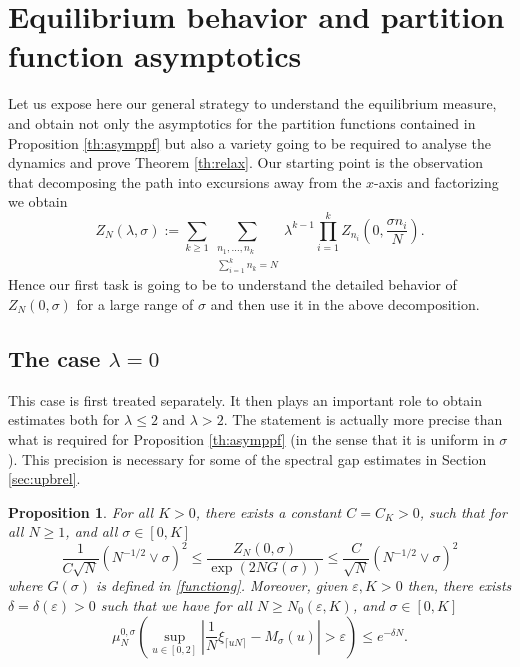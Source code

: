 \documentclass[reqno,11pt]{amsart}
\numberwithin{equation}{section}
\newcommand{\gep}{\varepsilon}       %
\newcommand{\gl}{\lambda}
\newtheorem{proposition}[theorem]{Proposition}
\newcommand{\sumtwo}[2]{\sum_{\substack{#1 \\ #2}}} %
\begin{document}
\section{Equilibrium behavior and partition function asymptotics} \label{sec:partitionfunction}

 Let us expose here our general strategy to understand the equilibrium measure, and obtain not only the asymptotics for the partition functions contained in Proposition \ref{th:asymppf} but also a variety going to be required to analyse the dynamics and prove Theorem \ref{th:relax}. Our starting point is the observation
that decomposing the path into excursions away from the $x$-axis and factorizing we obtain
\begin{equation}\label{excupath}
 Z_N(\gl, \sigma):=\sum_{k\ge 1}\sumtwo{n_1,\dots,n_k}{\sum_{i=1}^k n_k=N} \gl^{ k-1}  \prod_{i=1}^k  Z_{n_i}\left(0,\frac{\sigma n_i}{N}\right).
\end{equation}
Hence our first task is going to be to understand the detailed behavior of  $Z_N(0, \sigma)$ for a large range of $\sigma$ and then use it in the above decomposition.






\subsection{The case $\gl=0$}
This case is first treated separately. It then plays an important role to obtain estimates both for $\gl\le 2$ and $\gl>2$.
The statement is actually more precise than what is required for  Proposition \ref{th:asymppf} (in the sense that it is uniform in $\sigma$). This precision is necessary for some of the spectral gap estimates in Section \ref{sec:upbrel}. 


\begin{proposition}\label{th:zerocase}  For all $K>0$,
there exists a constant $C=C_K>0$,  such that for all $N\geq 1$, and all $\sigma \in [0,K]$
\begin{equation}\label{sigmazero}
\frac{1}{C\sqrt{N}}\left(N^{-1/2}\vee \sigma \right)^2 \leq \frac{Z_N(0, \sigma)}{\exp\left(2N G(\sigma)\right)} \leq \frac{C}{\sqrt{N}}\left(N^{-1/2}\vee \sigma \right)^2
\end{equation}
 where $G(\sigma)$ is defined in \eqref{functiong}.
Moreover,  given $\gep, K>0$  then, there exists $\delta= \delta( \gep)>0$ such that we have  for all $N \ge N_0(\gep,K)$, and  $\sigma \in [0, K]$
\begin{equation}\label{areashape}
 \mu^{0,\sigma}_N\left(   \sup_{u\in[0,2]}\left| \frac{1}{N}\xi_{\lceil u N\rceil}-M_{\sigma}(u) \right|>\gep\right)\le  e^{-\delta N}.
\end{equation}


\end{proposition}
\end{document}
